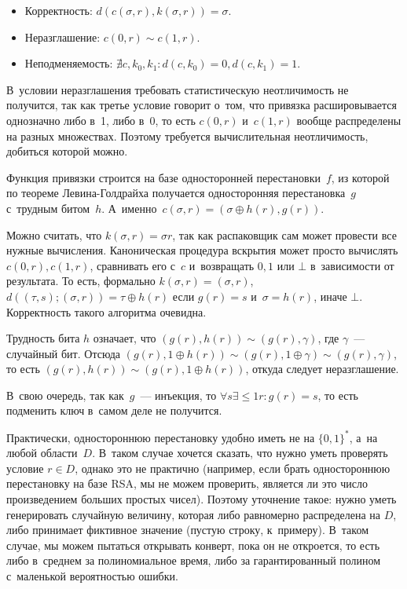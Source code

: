 \documentclass{article}
\begin{document}
\begin{itemize}
	\item Корректность: $d(c(\sigma, r), k(\sigma, r)) = \sigma$.
	\item Неразглашение: $c(0, r) \sim c(1, r)$.
	\item Неподменяемость: $\nexists c, k_0, k_1: d(c, k_0) = 0, d(c, k_1) = 1$.
\end{itemize}

\begin{remark}
	В~условии неразглашения требовать статистическую неотличимость не получится,
	так как третье условие говорит о~том, что привязка расшировывается однозначно
	либо в~1, либо в~0, то есть $c(0, r)$ и~$c(1, r)$ вообще распределены на
	разных множествах. Поэтому требуется вычислительная неотличимость, добиться
	которой можно.
\end{remark}

Функция привязки строится на базе односторонней перестановки~$f$, из которой по
теореме Левина-Голдрайха получается односторонняя перестановка~$g$ с~трудным
битом~$h$. А~именно~$c(\sigma, r) = (\sigma \oplus h(r), g(r))$.

Можно считать, что $k(\sigma, r) = \sigma r$, так как распаковщик сам может
провести все нужные вычисления. Каноническая процедура вскрытия может просто
вычислять $c(0, r), c(1, r)$, сравнивать его с~$c$ и~возвращать $0, 1$ или
$\bot$ в~зависимости от результата. То есть, формально $k(\sigma, r) = (\sigma,
r)$, $d((\tau, s); (\sigma, r)) = \tau \oplus h(r)$ если $g(r) = s$ и~$\sigma =
h(r)$, иначе $\bot$. Корректность такого алгоритма очевидна.

Трудность бита $h$ означает, что $(g(r), h(r)) \sim (g(r), \gamma)$, где
$\gamma$~--- случайный бит. Отсюда $(g(r), 1 \oplus h(r)) \sim (g(r),
1 \oplus \gamma) \sim (g(r), \gamma)$, то есть $(g(r), h(r)) \sim (g(r),
1 \oplus h(r))$, откуда следует неразглашение.

В~свою очередь, так как~$g$~--- инъекция, то $\forall s \exists \le 1 r: g(r) =
s$, то есть подменить ключ в~самом деле не получится.

\begin{remark}
	Практически, одностороннюю перестановку удобно иметь не на $\{0, 1\}^\ast$,
	а~на любой области~$D$. В~таком случае хочется сказать, что нужно уметь
	проверять условие $r \in D$, однако это не практично (например, если брать
	одностороннюю перестановку на базе RSA, мы не можем проверить, является ли это
	число произведением больших простых чисел). Поэтому уточнение такое: нужно
	уметь генерировать случайную величину, которая либо равномерно распределена на
	$D$, либо принимает фиктивное значение (пустую строку, к~примеру). В~таком
	случае, мы можем пытаться открывать конверт, пока он не откроется, то есть
	либо в~среднем за полиномиальное время, либо за гарантированный полином
	с~маленькой вероятностью ошибки.
\end{remark}
\end{document}
